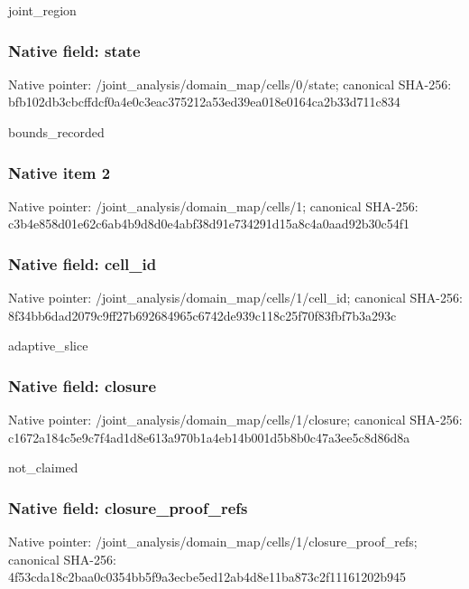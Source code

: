 \documentclass[10pt,a4paper]{article}
\begin{document}
\begingroup\raggedright\sloppy joint\_\allowbreak{}region\par\endgroup

\subsubsection{Native field: state}
Native pointer: /joint\_\allowbreak{}analysis/domain\_\allowbreak{}map/cells/0/state; canonical SHA-256: bfb102db3cbcffdcf0a4e0c3eac375212a53ed39ea018e0164ca2b33d711c834

\begingroup\raggedright\sloppy bounds\_\allowbreak{}recorded\par\endgroup

\subsubsection{Native item 2}
Native pointer: /joint\_\allowbreak{}analysis/domain\_\allowbreak{}map/cells/1; canonical SHA-256: c3b4e858d01e62c6ab4b9d8d0e4abf38d91e734291d15a8c4a0aad92b30c54f1

\subsubsection{Native field: cell\_\allowbreak{}id}
Native pointer: /joint\_\allowbreak{}analysis/domain\_\allowbreak{}map/cells/1/cell\_\allowbreak{}id; canonical SHA-256: 8f34bb6dad2079c9ff27b692684965c6742de939c118c25f70f83fbf7b3a293c

\begingroup\raggedright\sloppy adaptive\_\allowbreak{}slice\par\endgroup

\subsubsection{Native field: closure}
Native pointer: /joint\_\allowbreak{}analysis/domain\_\allowbreak{}map/cells/1/closure; canonical SHA-256: c1672a184c5e9c7f4ad1d8e613a970b1a4eb14b001d5b8b0c47a3ee5c8d86d8a

\begingroup\raggedright\sloppy not\_\allowbreak{}claimed\par\endgroup

\subsubsection{Native field: closure\_\allowbreak{}proof\_\allowbreak{}refs}
Native pointer: /joint\_\allowbreak{}analysis/domain\_\allowbreak{}map/cells/1/closure\_\allowbreak{}proof\_\allowbreak{}refs; canonical SHA-256: 4f53cda18c2baa0c0354bb5f9a3ecbe5ed12ab4d8e11ba873c2f11161202b945
\end{document}
